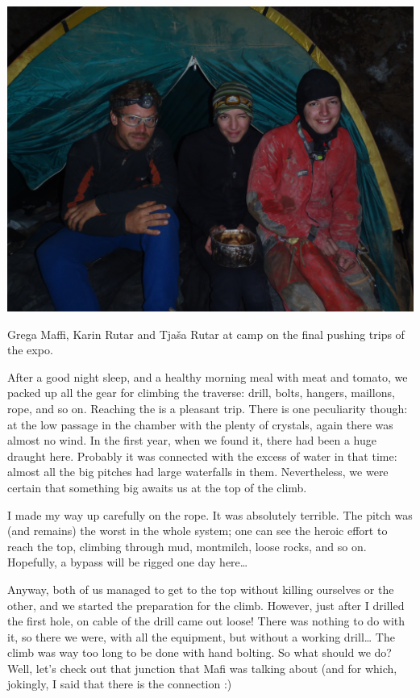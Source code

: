 \begin{pagefigure}
\checkoddpage \ifoddpage \forcerectofloat \else \forceversofloat \fi
   \centering
\includegraphics[width = \textwidth]{2012/sanje_za_duso/2012-08-13-1322-Maver-P8130192--orig.jpg}
\caption{Grega Maffi, Karin Rutar and Tjaša Rutar at camp  on the final pushing trips of the expo. } \label{x-ray pushing}
\end{pagefigure}


After a good night sleep, and a healthy morning meal with meat and
tomato, we packed up all the gear for climbing the traverse: drill,
bolts, hangers, maillons, rope, and so on. Reaching the  is a pleasant trip. There is one peculiarity though: at the
low passage in the chamber with the plenty of crystals, again there was
almost no wind. In the first year, when we found it, there had been a
huge draught here. Probably it was connected with the excess of water in
that time: almost all the big pitches had large waterfalls in them.
Nevertheless, we were certain that something big awaits us at the top of
the  climb.

I made my way up carefully on the rope. It was absolutely terrible. The
pitch was (and remains) the worst in the whole system; one can see the
heroic effort to reach the top, climbing through mud, montmilch, loose
rocks, and so on. Hopefully, a bypass will be rigged one day
here\ldots{}

Anyway, both of us managed to get to the top without killing ourselves
or the other, and we started the preparation for the climb. However,
just after I drilled the first hole, on cable of the drill came out
loose! There was nothing to do with it, so there we were, with all the
equipment, but without a working drill\ldots{} The climb was way too
long to be done with hand bolting. So what should we do? Well, let's
check out that junction that Mafi was talking about (and for which,
jokingly, I said that there is the connection :)

